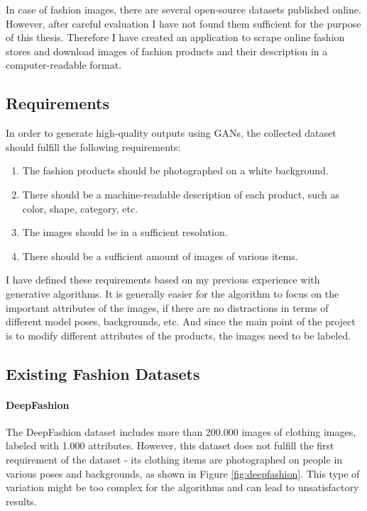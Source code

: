 \documentclass[12pt]{report}
\begin{document}
In case of fashion images, there are several open-source datasets published online. However, after careful evaluation I have not found them sufficient for the purpose of this thesis. Therefore I have created an application to scrape online fashion stores and download images of fashion products and their description in a computer-readable format.

\pagebreak
\subsection{Requirements}

In order to generate high-quality outputs using GANs, the collected dataset should fulfill the following requirements:
\begin{enumerate}
\item The fashion products should be photographed on a white background. 
\item There should be a machine-readable description of each product, such as color, shape, category, etc. 
\item The images should be in a sufficient resolution.
\item There should be a sufficient amount of images of various items.

\end{enumerate}
I have defined these requirements based on my previous experience with generative algorithms. It is generally easier for the algorithm to focus on the important attributes of the images, if there are no distractions in terms of different model poses, backgrounds, etc. And since the main point of the project is to modify different attributes of the products, the images need to be labeled.

\subsection{Existing Fashion Datasets}
\paragraph{DeepFashion}
The DeepFashion dataset \cite{liu2016deepfashion} includes more than 200.000 images of clothing images, labeled with 1.000 attributes. However, this dataset does not fulfill the first requirement of the dataset - its clothing items are photographed on people in various poses and backgrounds, as shown in Figure \ref{fig:deepfashion}. This type of variation might be too complex for the algorithms and can lead to unsatisfactory results.
\end{document}

